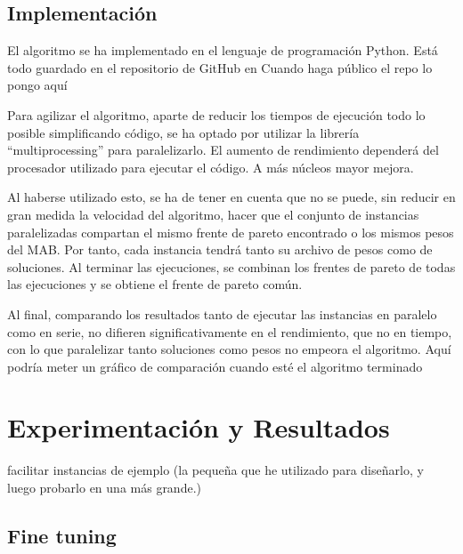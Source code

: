 \documentclass[12pt,a4paper]{book}
\begin{document}
\newpage

\section{Implementación}

El algoritmo se ha implementado en el lenguaje de programación Python. Está todo guardado en el repositorio de GitHub en \color{red}Cuando haga público el repo lo pongo aquí \color{black}

Para agilizar el algoritmo, aparte de reducir los tiempos de ejecución todo lo posible simplificando código, se ha optado por utilizar la librería ``multiprocessing'' para paralelizarlo.
El aumento de rendimiento dependerá del procesador utilizado para ejecutar el código. A más núcleos mayor mejora.

Al haberse utilizado esto, se ha de tener en cuenta que no se puede, sin reducir en gran medida la velocidad del algoritmo, hacer que el conjunto de instancias paralelizadas compartan
el mismo frente de pareto encontrado o los mismos pesos del MAB. Por tanto, cada instancia tendrá tanto su archivo de pesos como de soluciones. Al terminar las ejecuciones, se combinan los frentes de pareto de 
todas las ejecuciones y se obtiene el frente de pareto común.

Al final, comparando los resultados tanto de ejecutar las instancias en paralelo como en serie, no difieren significativamente en el rendimiento, que no en tiempo, con lo que paralelizar tanto soluciones como pesos no empeora 
el algoritmo. \color{red} Aquí podría meter un gráfico de comparación cuando esté el algoritmo terminado \color{black}

\chapter{Experimentación y Resultados}

facilitar instancias de ejemplo (la pequeña que he utilizado para diseñarlo, y luego probarlo en una más grande.)

\section{Fine tuning}
\end{document}

